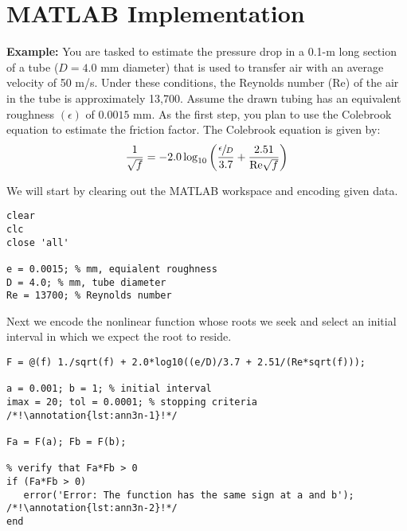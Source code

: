 \section{MATLAB Implementation}

\textbf{Example:} You are tasked to estimate the pressure drop in a 0.1-m long section of a tube ($D=4.0$ mm diameter) that is used to transfer air with an average velocity of 50 m/s.  Under these conditions, the Reynolds number (Re) of the air in the tube is approximately 13,700.  Assume the drawn tubing has an equivalent roughness $(\epsilon)$ of $0.0015$ mm.  As the first step, you plan to use the Colebrook equation to estimate the friction factor.  The Colebrook equation is given by:
\begin{equation*}
\frac{1}{\sqrt{f}} = -2.0 \log_{10}\left(\frac{\sfrac{\epsilon}{D}}{3.7} + \frac{2.51}{\text{Re}\sqrt{f}} \right)
\end{equation*}

We will start by clearing out the MATLAB workspace and encoding given data.
\begin{lstlisting}[name=lec3n-ex,style=myMatlab]
clear
clc
close 'all'

e = 0.0015; % mm, equialent roughness
D = 4.0; % mm, tube diameter
Re = 13700; % Reynolds number
\end{lstlisting}
Next we encode the nonlinear function whose roots we seek and select an initial interval in which we expect the root to reside.

\begin{lstlisting}[name=lec3n-ex, style=myMatlab]
F = @(f) 1./sqrt(f) + 2.0*log10((e/D)/3.7 + 2.51/(Re*sqrt(f)));

a = 0.001; b = 1; % initial interval
imax = 20; tol = 0.0001; % stopping criteria  /*!\annotation{lst:ann3n-1}!*/

Fa = F(a); Fb = F(b); 

% verify that Fa*Fb > 0
if (Fa*Fb > 0)
   error('Error: The function has the same sign at a and b'); /*!\annotation{lst:ann3n-2}!*/
end
\end{lstlisting}

